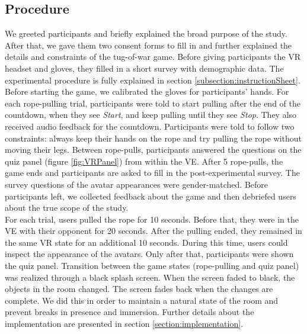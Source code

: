 \subsection{Procedure}
We greeted participants and briefly explained the broad purpose of the study. After that, we gave them two consent forms to fill in and further explained the details and constraints of the tug-of-war game. Before giving participants the VR headset and gloves, they filled in a short survey with demographic data. The experimental procedure is fully explained in section \ref{subsection:instructionSheet}.
\\
Before starting the game, we calibrated the gloves for participants' hands. For each rope-pulling trial, participants were told to start pulling after the end of the countdown, when they see \textit{Start}, and keep pulling until they see \textit{Stop}. They also received audio feedback for the countdown. Participants were told to follow two constraints: always keep their hands on the rope and try pulling the rope without moving their legs. Between rope-pulls, participants answered the questions on the quiz panel (figure \ref{fig:VRPanel}) from within the VE. After 5 rope-pulls, the game ends and participants are asked to fill in the post-experimental survey. The survey questions of the avatar appearances were gender-matched. Before participants left, we collected feedback about the game and then debriefed users about the true scope of the study.\\
For each trial, users pulled the rope for 10 seconds. Before that, they were in the VE with their opponent for 20 seconds. After the pulling ended, they remained in the same VR state for an additional 10 seconds. During this time, users could inspect the appearance of the avatars. Only after that, participants were shown the quiz panel. Transition between the game states (rope-pulling and quiz panel) was realized through a black splash screen. When the screen faded to black, the objects in the room changed. The screen fades back when the changes are complete. We did this in order to maintain a natural state of the room and prevent breaks in presence and immersion. Further details about the implementation are presented in section \ref{section:implementation}.
\\
